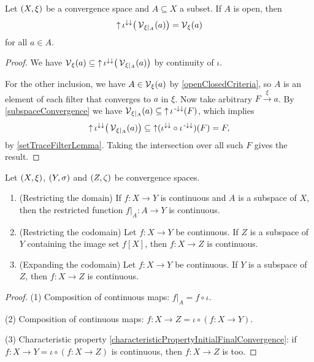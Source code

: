 \begin{proposition} \label{subspaceVicinityFilter}
Let $\sSet{X,\xi}$ be a convergence space and $A\subseteq X$ a subset. If $A$ is open, then
\[ \operatorname{\uparrow}\iota^{\downarrow\downarrow}\big(\operatorname{\mathcal{V}}_{\xi|_A}(a)\big) = \operatorname{\mathcal{V}}_\xi(a) \]
for all $a\in A$.
\end{proposition}
\begin{proof}
We have $\operatorname{\mathcal{V}}_\xi(a) \subseteq \operatorname{\uparrow}\iota^{\downarrow\downarrow}\big(\operatorname{\mathcal{V}}_{\xi|_A}(a)\big)$ by continuity of $\iota$.

For the other inclusion, we have $A\in \operatorname{\mathcal{V}}_\xi(a)$ by \ref{openClosedCriteria}, so $A$ is an element of each filter that converges to $a$ in $\xi$. Now take arbitrary $F\overset{\xi}{\longrightarrow} a$. By \ref{subspaceConvergence} we have $\operatorname{\mathcal{V}}_{\xi|_A}(a) \subseteq \operatorname{\uparrow} \iota^{{\text{\hspace{0.15em}-}\downarrow}\downarrow}(F)$, which implies
\[ \operatorname{\uparrow} \iota^{\downarrow\downarrow}\big(\operatorname{\mathcal{V}}_{\xi|_A}(a)\big) \subseteq \operatorname{\uparrow} (\iota^{\downarrow\downarrow}\circ \iota^{{\text{\hspace{0.15em}-}\downarrow}\downarrow})(F) = F, \]
by \ref{setTraceFilterLemma}. Taking the intersection over all such $F$ gives the result.
\end{proof}

\begin{proposition} \label{continuityRestrictionExpansion}
Let $\sSet{X,\xi}$, $\sSet{Y,\sigma}$ and $\sSet{Z,\zeta}$ be convergence spaces.
\begin{enumerate}
\item \textup{(Restricting the domain)} If $f:X\to Y$ is continuous and $A$ is a subspace of $X$, then the restricted function $f|_{A}:A\to Y$ is continuous.
\item \textup{(Restricting the codomain)} Let $f:X\to Y$ be continuous. If $Z$ is a subspace of $Y$ containing the image set $f[X]$, then $f:X\to Z$ is continuous.
\item \textup{(Expanding the codomain)} Let $f:X\to Y$ be continuous. If $Y$ is a subspace of $Z$, then $f:X\to Z$ is continuous.
\end{enumerate}
\end{proposition}
\begin{proof}
(1) Composition of continuous maps: $f|_{A} = f\circ\iota$.

(2) Composition of continuous maps: $f:X\to Z = \iota \circ (f: X\to Y)$.

(3) Characteristic property \ref{characteristicPropertyInitialFinalConvergence}: if $f:X\to Y = \iota \circ (f:X\to Z)$ is continuous, then $f:X\to Z$ is too.
\end{proof}


